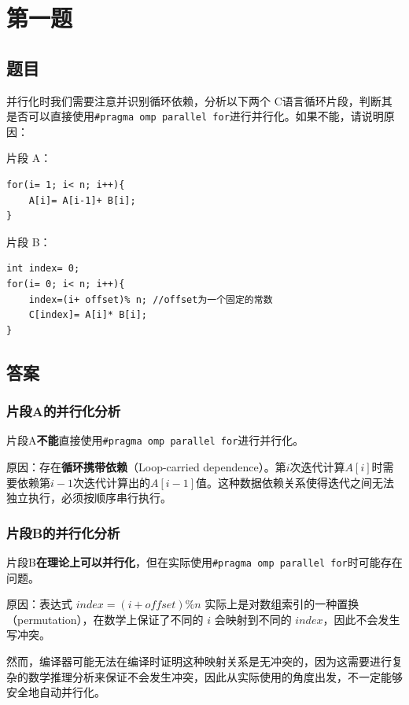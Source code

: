 \chapter{第一题}

\section{题目}

并行化时我们需要注意并识别循环依赖，分析以下两个 C语言循环片段，判断其是否可以直接使用\texttt{\#pragma omp parallel for}进行并行化。如果不能，请说明原因：

片段 A：
\begin{lstlisting}[style=cleancpp]
for(i= 1; i< n; i++){ 
    A[i]= A[i-1]+ B[i]; 
}
\end{lstlisting}

片段 B：
\begin{lstlisting}[style=cleancpp]
int index= 0;
for(i= 0; i< n; i++){ 
    index=(i+ offset)% n; //offset为一个固定的常数 
    C[index]= A[i]* B[i]; 
}
\end{lstlisting}

\section{答案}
\subsection{片段A的并行化分析}

片段A\textbf{不能}直接使用\texttt{\#pragma omp parallel for}进行并行化。

原因：存在\textbf{循环携带依赖}（Loop-carried dependence）。第$i$次迭代计算$A[i]$时需要依赖第$i-1$次迭代计算出的$A[i-1]$值。这种数据依赖关系使得迭代之间无法独立执行，必须按顺序串行执行。

\subsection{片段B的并行化分析}

片段B\textbf{在理论上可以并行化}，但在实际使用\texttt{\#pragma omp parallel for}时可能存在问题。

原因：表达式 $index = (i + offset) \% n$ 实际上是对数组索引的一种置换（permutation），在数学上保证了不同的 $i$ 会映射到不同的 $index$，因此不会发生写冲突。

然而，编译器可能无法在编译时证明这种映射关系是无冲突的，因为这需要进行复杂的数学推理分析来保证不会发生冲突，因此从实际使用的角度出发，不一定能够安全地自动并行化。

